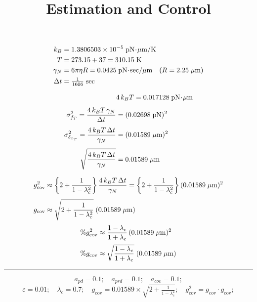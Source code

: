 \documentclass[UTF8,11pt,a4paper]{ctexart}
\title{\textbf{Estimation and Control}}
\author{}
\date{}
\newcommand{\gN}{\gamma_N}
\newcommand{\dt}{\Delta t}
\newcommand{\lc}{\lambda_c}
\begin{document}
\maketitle
\thispagestyle{fancy}

\begin{align}
k_B &= 1.3806503 \times 10^{-5} \;\text{pN}\!\cdot\!\mu\text{m/K} \notag\\
T &= 273.15 + 37 = 310.15 \;\text{K} \notag\\
\gN &= 6\pi\eta R = 0.0425 \;\text{pN}\!\cdot\!\text{sec}/\mu\text{m}
\quad (R = 2.25\;\mu\text{m}) \notag\\
\dt &= \tfrac{1}{1606} \;\text{sec} \notag
\end{align}

\begin{align}
&4\,k_B T = 0.017128 \;\text{pN}\!\cdot\!\mu\text{m} \notag\\[4pt]
\sigma^2_{f_T}= \frac{4\,k_B T\,\gN}{\dt} &= (0.02698\;\text{pN})^2 \notag\\[4pt]
\sigma^2_{\delta_{x_T}} = \frac{4\,k_B T\,\dt}{\gN} &= (0.01589\;\mu\text{m})^2 \notag\\[4pt]
\sqrt{\frac{4\,k_B T\,\dt}{\gN}} &= 0.01589\;\mu\text{m} \notag
\end{align}

\begin{align}
g_{\mathrm{cov}}^2 &\approx \left\{2+\frac{1}{1-\lc^2}\right\}
\frac{4\,k_B T\,\dt}{\gN}
= \left\{2+\frac{1}{1-\lc^2}\right\}(0.01589\;\mu\text{m})^2 \notag\\[4pt]
g_{\mathrm{cov}} &\approx \sqrt{2+\frac{1}{1-\lc^2}}\;(0.01589\;\mu\text{m}) \notag
\end{align}
\begin{align}
\%g_{\mathrm{cov}}^2 &\approx \frac{1-\lc}{1+\lc}\,(0.01589\;\mu\text{m})^2 \notag\\[2pt]
\%g_{\mathrm{cov}} &\approx \sqrt{\frac{1-\lc}{1+\lc}}\;(0.01589\;\mu\text{m}) \notag
\end{align}

\noindent\rule{\textwidth}{0.8pt}

\[
a_{pd}=0.1;\quad a_{prd}=0.1;\quad a_{cov}=0.1;
\]
\[
\varepsilon=0.01;\quad \lc=0.7;\quad
g_{\mathrm{cov}}=0.01589\times\sqrt{2+\tfrac{1}{1-\lc^2}};\quad
g_{\mathrm{cov}}^2 = g_{\mathrm{cov}}\cdot g_{\mathrm{cov}};
\]
\end{document}
